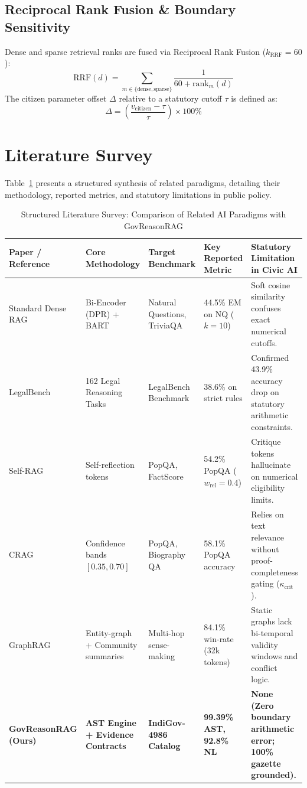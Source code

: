 \documentclass[conference]{IEEEtran}
\begin{document}
\subsection{Reciprocal Rank Fusion \& Boundary Sensitivity}
Dense and sparse retrieval ranks are fused via Reciprocal Rank Fusion ($k_{\text{RRF}}=60$):
\begin{equation}
\mathrm{RRF}(d) = \sum_{m \in \{\text{dense}, \text{sparse}\}} \frac{1}{60 + \text{rank}_m(d)}
\end{equation}
The citizen parameter offset $\Delta$ relative to a statutory cutoff $\tau$ is defined as:
\begin{equation}
\Delta = \left( \frac{v_{\text{citizen}} - \tau}{\tau} \right) \times 100\%
\end{equation}

\section{Literature Survey}
Table~\ref{tab:lit_survey} presents a structured synthesis of related paradigms, detailing their methodology, reported metrics, and statutory limitations in public policy.

\begin{table}[!t]
\caption{Structured Literature Survey: Comparison of Related AI Paradigms with GovReasonRAG}
\label{tab:lit_survey}
\centering
\begin{tabular}{lllll}
\toprule
\textbf{Paper / Reference} & \textbf{Core Methodology} & \textbf{Target Benchmark} & \textbf{Key Reported Metric} & \textbf{Statutory Limitation in Civic AI} \\
\midrule
Standard Dense RAG \cite{lewis2020retrieval} & Bi-Encoder (DPR) + BART & Natural Questions, TriviaQA & 44.5\% EM on NQ ($k=10$) & Soft cosine similarity confuses exact numerical cutoffs. \\
LegalBench \cite{guha2023legalbench} & 162 Legal Reasoning Tasks & LegalBench Benchmark & 38.6\% on strict rules & Confirmed 43.9\% accuracy drop on statutory arithmetic constraints. \\
Self-RAG \cite{asai2023self} & Self-reflection tokens & PopQA, FactScore & 54.2\% PopQA ($w_{\text{rel}}=0.4$) & Critique tokens hallucinate on numerical eligibility limits. \\
CRAG \cite{yan2024corrective} & Confidence bands $[0.35, 0.70]$ & PopQA, Biography QA & 58.1\% PopQA accuracy & Relies on text relevance without proof-completeness gating ($\kappa_{\text{crit}}$). \\
GraphRAG \cite{edge2024graphrag} & Entity-graph + Community summaries & Multi-hop sense-making & 84.1\% win-rate (32k tokens) & Static graphs lack bi-temporal validity windows and conflict logic. \\
\textbf{GovReasonRAG (Ours)} & \textbf{AST Engine + Evidence Contracts} & \textbf{IndiGov-4986 Catalog} & \textbf{99.39\% AST, 92.8\% NL} & \textbf{None (Zero boundary arithmetic error; 100\% gazette grounded).} \\
\bottomrule
\end{tabular}
\end{table}
\end{document}
